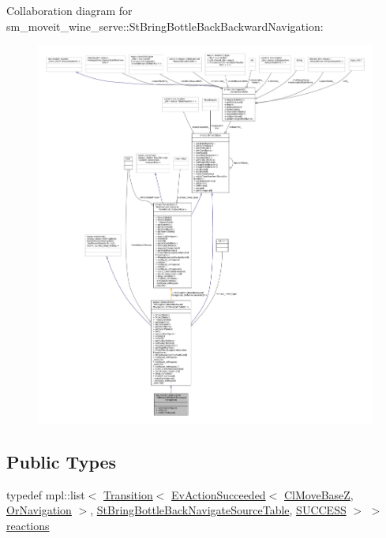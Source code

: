 Collaboration diagram for sm\+\_\+moveit\+\_\+wine\+\_\+serve\+:\+:St\+Bring\+Bottle\+Back\+Backward\+Navigation\+:
\nopagebreak
\begin{figure}[H]
\begin{center}
\leavevmode
\includegraphics[width=350pt]{structsm__moveit__wine__serve_1_1StBringBottleBackBackwardNavigation__coll__graph}
\end{center}
\end{figure}
\subsection*{Public Types}
\begin{DoxyCompactItemize}
\item 
typedef mpl\+::list$<$ \hyperlink{classsmacc_1_1Transition}{Transition}$<$ \hyperlink{structsmacc_1_1default__events_1_1EvActionSucceeded}{Ev\+Action\+Succeeded}$<$ \hyperlink{classcl__move__base__z_1_1ClMoveBaseZ}{Cl\+Move\+BaseZ}, \hyperlink{classsm__moveit__wine__serve_1_1OrNavigation}{Or\+Navigation} $>$, \hyperlink{structsm__moveit__wine__serve_1_1StBringBottleBackNavigateSourceTable}{St\+Bring\+Bottle\+Back\+Navigate\+Source\+Table}, \hyperlink{structsmacc_1_1default__transition__tags_1_1SUCCESS}{S\+U\+C\+C\+E\+SS} $>$ $>$ \hyperlink{structsm__moveit__wine__serve_1_1StBringBottleBackBackwardNavigation_ac421e44272cd54e0103e8eeba084028d}{reactions}
\end{DoxyCompactItemize}
